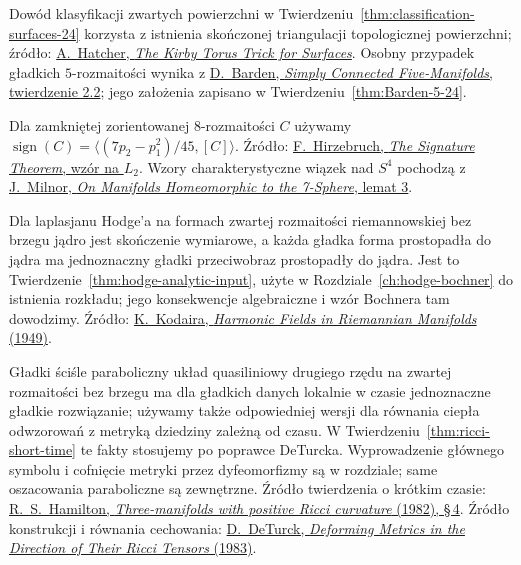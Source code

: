 \begin{description}[leftmargin=2.9cm,style=nextline]
\item[Triangulacja powierzchni i wymiar pięć.]
  Dowód klasyfikacji zwartych powierzchni
  w Twierdzeniu~\ref{thm:classification-surfaces-24}
  korzysta z istnienia skończonej triangulacji
  topologicznej powierzchni; źródło:
  \href{https://pi.math.cornell.edu/~hatcher/Papers/TorusTrick.pdf}
  {A.\ Hatcher, \emph{The Kirby Torus Trick for Surfaces}}.
  Osobny przypadek gładkich
  $5$-rozmaitości wynika z
  \href{https://www.sas.rochester.edu/mth/sites/doug-ravenel/otherpapers/barden.pdf}
  {D.\ Barden, \emph{Simply Connected
  Five-Manifolds}, twierdzenie 2.2};
  jego założenia zapisano w
  Twierdzeniu~\ref{thm:Barden-5-24}.

\item[Sygnatura i sfery Milnora.]
  Dla zamkniętej zorientowanej
  $8$-rozmaitości $C$ używamy
  $\operatorname{sign}(C)=
  \langle(7p_2-p_1^2)/45,[C]\rangle$.
  Źródło:
  \href{https://webhomes.maths.ed.ac.uk/~v1ranick/papers/hirzrem.pdf}
  {F.\ Hirzebruch, \emph{The Signature Theorem},
  wzór na $L_2$}.
  Wzory charakterystyczne
  wiązek nad $S^4$ pochodzą
  z \href{https://sites.math.rutgers.edu/~feehan/teaching/math866/milnor7sphere.pdf}
  {J.\ Milnor, \emph{On Manifolds Homeomorphic
  to the 7-Sphere}, lemat 3}.

\item[Analityczna teoria Hodge'a.]
  Dla laplasjanu Hodge'a na formach zwartej
  rozmaitości riemannowskiej bez brzegu
  jądro jest skończenie wymiarowe, a każda
  gładka forma prostopadła do jądra ma
  jednoznaczny gładki przeciwobraz
  prostopadły do jądra. Jest to
  Twierdzenie~\ref{thm:hodge-analytic-input},
  użyte w Rozdziale~\ref{ch:hodge-bochner}
  do istnienia rozkładu; jego konsekwencje
  algebraiczne i wzór Bochnera tam dowodzimy.
  Źródło:
  \href{https://doi.org/10.2307/1969552}
  {K.\ Kodaira, \emph{Harmonic Fields in
  Riemannian Manifolds} (1949)}.

\item[Analityczna teoria potoku Ricciego.]
  Gładki ściśle paraboliczny układ
  quasiliniowy drugiego rzędu na zwartej
  rozmaitości bez brzegu ma dla gładkich
  danych lokalnie w czasie jednoznaczne
  gładkie rozwiązanie; używamy także
  odpowiedniej wersji dla równania ciepła
  odwzorowań z metryką dziedziny zależną
  od czasu. W
  Twierdzeniu~\ref{thm:ricci-short-time}
  te fakty stosujemy po poprawce DeTurcka.
  Wyprowadzenie głównego symbolu i cofnięcie
  metryki przez dyfeomorfizmy są w rozdziale;
  same oszacowania paraboliczne są zewnętrzne.
  Źródło twierdzenia o krótkim czasie:
  \href{https://projecteuclid.org/journals/journal-of-differential-geometry/volume-17/issue-2/Three-manifolds-with-positive-Ricci-curvature/10.4310/jdg/1214436922.full}
  {R.\ S.\ Hamilton, \emph{Three-manifolds with
  positive Ricci curvature} (1982), \S\,4}.
  Źródło konstrukcji i równania cechowania:
  \href{https://projecteuclid.org/journals/journal-of-differential-geometry/volume-18/issue-1/Deforming-metrics-in-the-direction-of-their-Ricci-tensors/10.4310/jdg/1214509286.full}
  {D.\ DeTurck, \emph{Deforming Metrics in the
  Direction of Their Ricci Tensors} (1983)}.


\end{description}
